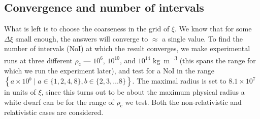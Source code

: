 \documentclass[]{article}
\newcommand{\rhoCentre}{\rho_\mathrm{c}}
\begin{document}
\subsection{Convergence and number of intervals}\label{subsec:convergence}
	What is left is to choose the coarseness in the grid of $\xi$. We know that for some $\Delta \xi$ small enough, the answers will converge to $\approx$ a single value. To find the number of intervals (NoI) at which the result converges, we make experimental runs at three different $\rhoCentre$ --- $10^6$, $10^{10}$, and $10^{14}$ \si{kg.m^{-3}} (this spans the range for which we run the experiment later), and test for a NoI in the range $\left\{a \times 10^b \mid a \in \{1,2,4,8\}, b \in \{2,3,\ldots 8\}\right\}$. The maximal radius is set to $8.1 \times 10^7$ in units of $\xi$, since this turns out to be about the maximum physical radius a white dwarf can be for the range of $\rhoCentre$ we test. Both the non-relativistic and relativistic cases are considered.
\end{document}
